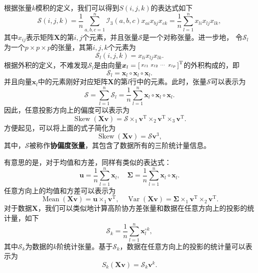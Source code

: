 根据张量\( k \)模积的定义，我们可以得到\( S(i, j, k) \)的表达式如下
\[
    \mathcal{S}(i, j, k) = \frac{1}{n} \sum_{a, b, c = 1}^n \mathcal{I}_3(a, b, c) x_{ai} x_{bj} x_{ck} = \frac{1}{n} \sum_{l=1}^n x_{li} x_{lj} x_{lk},
\]
其中\( x_{ij} \)表示矩阵\( \mathbf{X} \)的第\( i, j \)个元素，并且张量\( \mathcal{S} \)是一个对称张量。进一步地， 令\( \mathcal{S}_l \) 为一个\( p \times p \times p \)的张量，其第\( i, j, k \)个元素为
\[
    \mathcal{S}_l(i, j, k) = x_{li} x_{lj} x_{lk}.
\]
根据外积的定义，不难发现\( \mathcal{S}_l \)是由向量\( \boldsymbol{x}_l = \begin{bsmallmatrix} x_{l1} & x_{l2} & \cdots & x_{lp} \end{bsmallmatrix}^{\mathrm{T}} \)的外积构成的，即
\[
    \mathcal{S}_l = \bm{x}_l \circ \bm{x}_l \circ \bm{x}_l.
\]
并且向量\( \bm{x}_l \)中的元素刚好对应矩阵\( \mathbf{X} \)的第\( l \)行中的元素。此时，张量\( \mathcal{S} \)可以表示为
\[
    \mathcal{S} = \sum_{l=1}^n \mathcal{S}_l = \frac{1}{n} \sum_{l=1}^n \bm{x}_l \circ \bm{x}_l \circ \bm{x}_l.
\]
因此，任意投影方向上的偏度可以表示为
\[
    \operatorname{Skew}(\mathbf{X} \bm{v}) = \mathcal{S} \times_1 \bm{v}^{\mathrm{T}} \times_2 \bm{v}^{\mathrm{T}} \times_3 \bm{v}^{\mathrm{T}}.
\]
方便起见，可以将上面的式子简化为
\[
    \operatorname{Skew}(\mathbf{X} \bm{v}) = \mathcal{S} \bm{v}^3,
\]
其中，\( \mathcal{S} \)被称作\textbf{协偏度张量}，其包含了数据所有的三阶统计量信息。

有意思的是，对于均值和方差，同样有类似的表达式：
\[
    \bm{u} = \frac{1}{n} \sum_{l=1}^n \bm{x}_l, \quad \mathbf{\Sigma} = \frac{1}{n} \sum_{l=1}^n \bm{x}_l \circ \bm{x}_l.
\]
任意方向上的均值和方差可以表示为
\[
    \operatorname{Mean}(\mathbf{X} \bm{v}) = \bm{u} \times_1 \bm{v}^{\mathrm{T}}, \quad \operatorname{Var}(\mathbf{X} \bm{v}) = \mathbf{\Sigma} \times_1 \bm{v}^{\mathrm{T}} \times_2 \bm{v}^{\mathrm{T}}.
\]
对于数据\( \mathbf{X} \)，我们可以类似地计算高阶协方差张量和数据在任意方向上的投影的统计量，如下
\[
    \mathcal{S}_k = \frac{1}{n} \sum_{l=1}^n \bm{x}_l^{\circ k},
\]
其中\( \mathcal{S}_k \)为数据的\( k \)阶统计张量。基于\( \mathcal{S}_k \)，数据在任意方向上的投影的统计量可以表示为
\[
    S_k(\mathbf{X} \bm{v}) = \mathcal{S}_k \bm{v}^k.
\]



